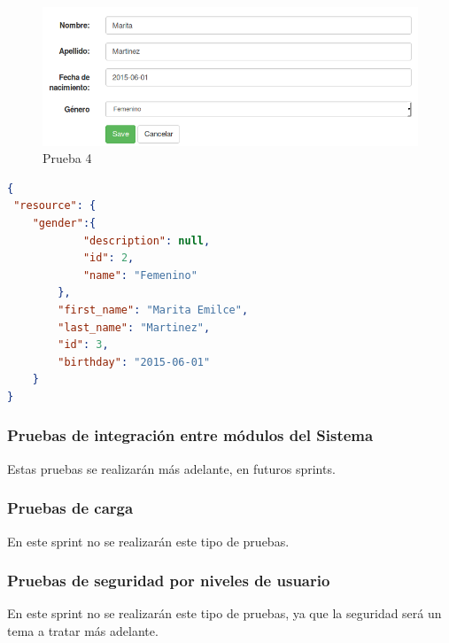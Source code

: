 \begin{figure}[h]
  \centering
  \includegraphics[width=.8\textwidth]{img/tp1_parte2/1-prueba_4}
  \caption{Prueba 4}
  \label{prueba4}
\end{figure}

\begin{lstlisting}[language=json,firstnumber=1,  breaklines=true, caption= Json del perfil id:3 modificado, label=JsonProfile]
{
 "resource": {
    "gender":{
            "description": null,
            "id": 2,
            "name": "Femenino"
        },
        "first_name": "Marita Emilce",
        "last_name": "Martinez",
        "id": 3,
        "birthday": "2015-06-01"
    }
}
\end{lstlisting}

\clearpage
    
    


    
    \clearpage
\subsubsection{Pruebas de integración entre módulos del Sistema}
Estas pruebas se realizarán más adelante, en futuros sprints.
\subsubsection{Pruebas de carga}
En este sprint no se realizarán este tipo de pruebas.
\subsubsection{Pruebas de seguridad por niveles de usuario}
En este sprint no se realizarán este tipo de pruebas, ya que la seguridad será un tema a tratar más adelante.

